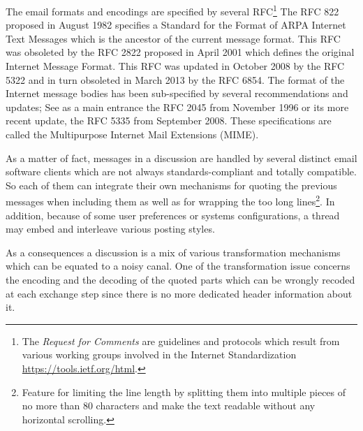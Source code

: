 The email %
formats and encodings are specified by several RFC\footnote{The \textit{Request for Comments} are guidelines and protocols which result from various working groups involved in the Internet Standardization \url{https://tools.ietf.org/html}.}
%
The RFC 822 proposed in August 1982 specifies a Standard for the Format of ARPA Internet Text Messages which is the ancestor of the current message format. This RFC was obsoleted by the RFC 2822  proposed in April 2001 which defines the original Internet Message Format. This RFC was updated in October 2008 by the RFC 5322 and in turn obsoleted in March 2013 by the RFC 6854.
%
The format of the Internet message bodies has been sub-specified by several recommendations and updates; See as a main entrance the RFC 2045 from November 1996 or its more recent update, the RFC 5335 from September 2008. These specifications are called the Multipurpose Internet Mail Extensions (MIME).



As a matter of fact, messages in a discussion are handled by several distinct email software clients which are not always standards-compliant and totally compatible.
So each of them can integrate their own mechanisms 
for quoting the previous messages when including them as well as 
for wrapping the too long lines\footnote{Feature for limiting the line length by splitting them into multiple pieces of no more than 80 characters and make the text readable without any horizontal scrolling.}.
%
In addition, because of some user preferences or systems configurations, a thread may embed and interleave various posting styles.  

As a consequences a discussion is a mix of various transformation mechanisms which can be equated to a noisy canal. 
%
One of the transformation issue concerns the encoding and the decoding of the quoted parts which can be wrongly recoded at each exchange step since there is no more dedicated header information about it.




